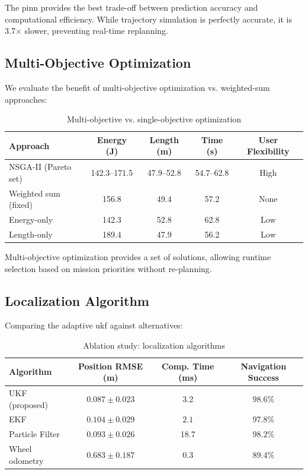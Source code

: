 The \acrshort{pinn} provides the best trade-off between prediction accuracy and computational efficiency. While trajectory simulation is perfectly accurate, it is 3.7$\times$ slower, preventing real-time replanning.

\subsection{Multi-Objective Optimization}

We evaluate the benefit of multi-objective optimization vs. weighted-sum approaches:

\begin{table}[htbp]
\centering
\caption{Multi-objective vs. single-objective optimization}
\label{tab:ablation_moo}
\begin{tabular}{lcccc}
\toprule
\textbf{Approach} & \textbf{Energy (J)} & \textbf{Length (m)} & \textbf{Time (s)} & \textbf{User Flexibility} \\
\midrule
NSGA-II (Pareto set) & 142.3--171.5 & 47.9--52.8 & 54.7--62.8 & High \\
Weighted sum (fixed) & 156.8 & 49.4 & 57.2 & None \\
Energy-only & 142.3 & 52.8 & 62.8 & Low \\
Length-only & 189.4 & 47.9 & 56.2 & Low \\
\bottomrule
\end{tabular}
\end{table}

Multi-objective optimization provides a set of solutions, allowing runtime selection based on mission priorities without re-planning.

\subsection{Localization Algorithm}

Comparing the adaptive \acrshort{ukf} against alternatives:

\begin{table}[htbp]
\centering
\caption{Ablation study: localization algorithms}
\label{tab:ablation_localization}
\begin{tabular}{lccc}
\toprule
\textbf{Algorithm} & \textbf{Position RMSE (m)} & \textbf{Comp. Time (ms)} & \textbf{Navigation Success} \\
\midrule
UKF (proposed) & $\mathbf{0.087 \pm 0.023}$ & 3.2 & $\mathbf{98.6\%}$ \\
EKF & $0.104 \pm 0.029$ & $\mathbf{2.1}$ & 97.8\% \\
Particle Filter & $0.093 \pm 0.026$ & 18.7 & 98.2\% \\
Wheel odometry & $0.683 \pm 0.187$ & 0.3 & 89.4\% \\
\bottomrule
\end{tabular}
\end{table}

